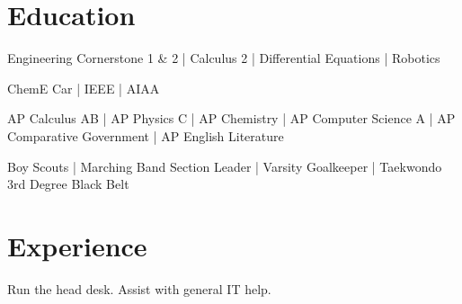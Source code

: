 \documentclass{resume}
\begin{document}
\namesection{Joshua}{Field}{ 

\href{mailto:joshfield99@gmail.com}{joshfield99@gmail.com} | 626.616.6320}

\section{Education}
\vspace{0.5mm} 
\vspace{0.5mm}
\begin{tightemize}
\item[]  Engineering Cornerstone 1 \& 2 | Calculus 2 | Differential Equations | Robotics
\item[]  ChemE Car | IEEE | AIAA
\end{tightemize}
\sectionsep

\vspace{0.5mm} 
\descript{}
\vspace{0.5mm}
\begin{tightemize}
\item[] AP Calculus AB | AP Physics C | AP Chemistry | AP Computer Science A | AP Comparative Government | AP English Literature
\item[]  Boy Scouts | Marching Band Section Leader | Varsity Goalkeeper | Taekwondo 3rd Degree Black Belt 
\end{tightemize}
\sectionsep

\section{Experience}
\begin{tightemize}\item Run the head desk. Assist with general IT help.
\end{tightemize}
\sectionsep
\end{document}
